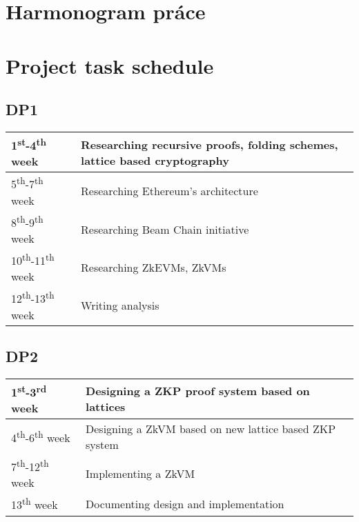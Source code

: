 \thispagestyle{empty}

\ifx\FIITlagEN\undefined
\chapter{Harmonogram práce}
\else
\chapter{Project task schedule}
\fi

\renewcommand*{\thepage}{A-\arabic{page}}

\section{DP1}

\begin{tabular}{|l||p{}|}
\hline
1\textsuperscript{st}-4\textsuperscript{th} week    & Researching recursive proofs, folding schemes, lattice based cryptography \\
\hline
5\textsuperscript{th}-7\textsuperscript{th} week    & Researching Ethereum's architecture \\
\hline
8\textsuperscript{th}-9\textsuperscript{th} week    & Researching Beam Chain initiative \\
\hline
10\textsuperscript{th}-11\textsuperscript{th} week  & Researching ZkEVMs, ZkVMs \\
\hline
12\textsuperscript{th}-13\textsuperscript{th} week  & Writing analysis \\
\hline
\end{tabular}

\section{DP2}

\begin{tabular}{|l||p{}|}
\hline
1\textsuperscript{st}-3\textsuperscript{rd} week    & Designing a ZKP proof system based on lattices  \\
\hline
4\textsuperscript{th}-6\textsuperscript{th} week    & Designing a ZkVM based on new lattice based ZKP system  \\
\hline
7\textsuperscript{th}-12\textsuperscript{th} week   & Implementing a ZkVM  \\
\hline
13\textsuperscript{th} week  & Documenting design and implementation  \\
\hline
\end{tabular}

